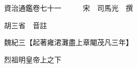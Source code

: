 










 


 
 


 

  
  
  
  
  





  
  
  
  
  
 
  

  

  
  
  



  

 
 

  
   




  

  
  


  　　資治通鑑卷七十一　　　宋　司馬光　撰

　　胡三省　音註

　　魏紀三【起著雍涒灘盡上章閹茂凡三年】

　　烈祖明皇帝上之下

